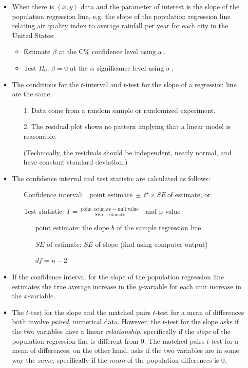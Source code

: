 \begin{itemize}
\item When there is $(x, y)$ data and the parameter of interest is the slope of the population regression line, e.g. the slope of the population regression line relating air quality index to average rainfall per year for each city in the United States:
\begin{itemize}
\item Estimate $\beta$ at the C\% confidence level using a .
\item Test $H_0$: $\beta=0$ at the $\alpha$ significance level using a .
\end{itemize}
\item The conditions for the $t$-interval and $t$-test for the slope of a regression line are the same.
\begin{itemize}
\setlength{\itemsep}{0mm}
\item[1.] Data come from a random sample or randomized experiment.
\item[2.] The residual plot shows no pattern implying that a linear model is reasonable. \item[] (Technically, the residuals should be independent, nearly normal, and have constant standard deviation.)
\end{itemize}
\item The confidence interval and test statistic are calculated as follows:   
\begin{itemize}
\item[] Confidence interval:\ \  $\text{point estimate}\ \pm\ t^{\star} \times SE\ \text{of estimate}$, or
\item[] Test statistic:  $T = \frac{\text{point estimate } - \text{ null value}}{SE\ \text{of estimate}}$ \ and p-value
\begin{itemize}
\item[] point estimate:  the slope $b$ of the sample regression line
\item[] $SE$ of estimate:  $SE$ of slope (find using computer output)
\item[] $df = n-2$
\end{itemize}
\end{itemize}


\item If the confidence interval for the slope of the population regression line estimates the true average increase in the $y$-variable for each unit increase in the $x$-variable.

\item The $t$-test for the slope and the matched pairs $t$-test for a mean of differences both involve \emph{paired}, numerical data.  However, the $t$-test for the slope asks if the two variables have a linear \emph{relationship}, specifically if the \emph{slope} of the population regression line is different from 0.  The matched pairs $t$-test for a mean of differences, on the other hand, asks if the two variables are in some way the \emph{same}, specifically if the \emph{mean} of the population differences is 0.  
\end{itemize}

